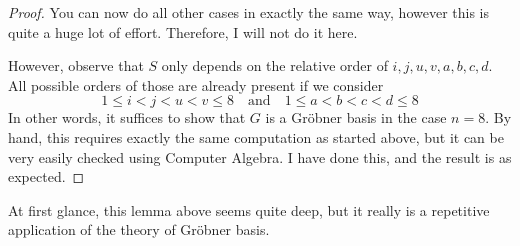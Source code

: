 \documentclass{scrartcl}
\theoremstyle{definition}
\begin{document}
\begin{proof}
    You can now do all other cases in exactly the same way, however this is quite a huge lot of effort.
    Therefore, I will not do it here.

    However, observe that $S$ only depends on the relative order of $i, j, u, v, a, b, c, d$.
    All possible orders of those are already present if we consider
    \begin{equation*}
        1 \leq i < j < u < v \leq 8 \quad \text{and} \quad 1 \leq a < b < c < d \leq 8
    \end{equation*}
    In other words, it suffices to show that $G$ is a Gröbner basis in the case $n = 8$.
    By hand, this requires exactly the same computation as started above, but it can be very easily checked using Computer Algebra.
    I have done this, and the result is as expected.
\end{proof}
At first glance, this lemma above seems quite deep, but it really is a repetitive application of the theory of Gröbner basis.
\end{document}
